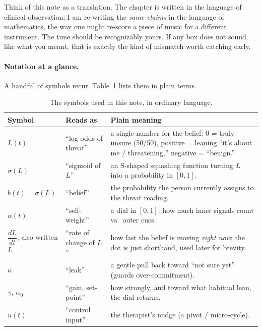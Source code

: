 \documentclass[11pt]{article}
\newcommand{\sig}{\sigma}
\begin{document}
\begin{plainbox}
Think of this note as a translation. The chapter is written in the language of clinical observation; I am re-writing the \emph{same claims} in the language of mathematics, the way one might re-score a piece of music for a different instrument. The tune should be recognizably yours. If any box does not sound like what you meant, that is exactly the kind of mismatch worth catching early.
\end{plainbox}

\paragraph{Notation at a glance.} A handful of symbols recur. Table~\ref{tab:notation} lists them in plain terms.

\begin{table}[h]
\centering\small
\caption{The symbols used in this note, in ordinary language.}
\label{tab:notation}
\begin{tabular}{@{}l l p{7.7cm}@{}}
\toprule
Symbol & Reads as & Plain meaning\\
\midrule
$L(t)$ & ``log-odds of threat'' & a single number for the belief: $0$ = truly unsure (50/50), positive = leaning ``it's about me / threatening,'' negative = ``benign.''\\
$\sig(L)$ & ``sigmoid of $L$'' & an S-shaped squashing function turning $L$ into a probability in $[0,1]$.\\
$b(t)=\sig(L)$ & ``belief'' & the probability the person currently assigns to the threat reading.\\
$\alpha(t)$ & ``self-weight'' & a dial in $[0,1]$: how much inner signals count vs.\ outer cues.\\
$\dfrac{dL}{dt}$, also written $\dot L$ & ``rate of change of $L$'' & how fast the belief is moving \emph{right now}; the dot is just shorthand, used later for brevity.\\
$\kappa$ & ``leak'' & a gentle pull back toward ``not sure yet'' (guards over-commitment).\\
$\gamma,\ \alpha_0$ & ``gain, set-point'' & how strongly, and toward what habitual lean, the dial returns.\\
$u(t)$ & ``control input'' & the therapist's nudge (a pivot / micro-cycle).\\
\bottomrule
\end{tabular}
\end{table}

\end{document}
